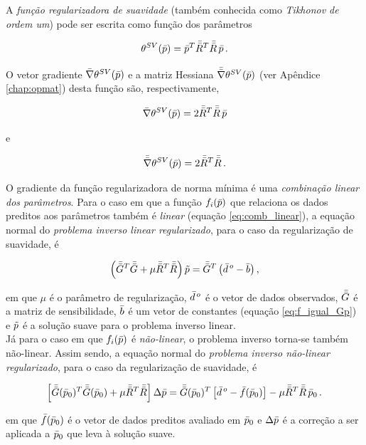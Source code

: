 \indent A {\it função regularizadora de suavidade} (também conhecida como
{\it Tikhonov de ordem um}) pode ser escrita como função dos
parâmetros

\begin{equation}
\theta^{SV}(\bar{p}) = \bar{p}^T \bar{\bar{R}}^T \bar{\bar{R}}\thinspace\bar{p} \thinspace .
\label{eq:suavidade}
\end{equation}

\noindent O vetor gradiente $\bar{\nabla}\theta^{SV}(\bar{p})$ e a matriz Hessiana
$\bar{\bar{\nabla}}\theta^{SV}(\bar{p})$ (ver Apêndice \ref{chap:opmat}) desta função
são, respectivamente,

\begin{equation}
\bar{\nabla}\theta^{SV}(\bar{p}) = 2\bar{\bar{R}}^T \bar{\bar{R}}\thinspace\bar{p}
\end{equation}

\noindent e

\begin{equation}
\bar{\bar{\nabla}}\theta^{SV}(\bar{p}) = 2\bar{\bar{R}}^T \bar{\bar{R}} \thinspace .
\end{equation}

\indent O gradiente da função regularizadora de norma mínima é uma
{\it combinação linear dos parâmetros}.
Para o caso em que a função $f_i(\bar{p})$ que relaciona
os dados preditos aos parâmetros também é {\it linear} (equação \ref{eq:comb_linear}),
a equação normal do {\it problema inverso linear regularizado},
para o caso da regularização de suavidade, é

\begin{equation}
\left(\bar{\bar{G}}^T\bar{\bar{G}} + \mu\bar{\bar{R}}^T\bar{\bar{R}}\right)\tilde{p} =
    \bar{\bar{G}}^T\left(\bar{d}^{\thinspace o} - \bar{b} \right) ,
\end{equation}

\noindent em que $\mu$ é o parâmetro de regularização, $\bar{d}^{\thinspace o}$
é o vetor de dados observados, $\bar{\bar{G}}$ é a matriz de sensibilidade, $\bar{b}$
é um vetor de constantes (equação \ref{eq:f_igual_Gp}) e $\tilde{p}$ é a solução
suave para o problema inverso linear.
\\
\indent Já para o caso em que $f_i(\bar{p})$ é {\it não-linear}, o problema
inverso torna-se também não-linear. Assim sendo, a equação normal do
{\it problema inverso não-linear regularizado}, para o caso da regularização de
suavidade, é

\begin{equation}
\left[\bar{\bar{G}}(\bar{p}_0)^T\bar{\bar{G}}(\bar{p}_0) +
      \mu\bar{\bar{R}}^T\bar{\bar{R}}\right]\Delta\bar{p} =
\bar{\bar{G}}(\bar{p}_0)^T \left[\bar{d}^{\thinspace o} - \bar{f}(\bar{p}_0)\right] -
\mu\bar{\bar{R}}^T\bar{\bar{R}}\thinspace\bar{p}_0
    \thinspace .
\end{equation}

\noindent em que $\bar{f}(\bar{p}_0)$ é o vetor de dados preditos avaliado em
$\bar{p}_0$ e $\Delta\bar{p}$ é a correção a ser aplicada a $\bar{p}_0$
que leva à solução suave.
